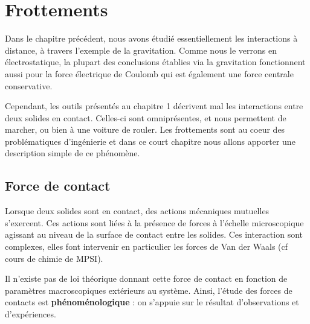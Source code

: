 \documentclass[11pt,fleqn]{book} %
\begin{document}









\setcounter{chapter}{1}

\chapter{Frottements}

Dans le chapitre précédent, nous avons étudié essentiellement les interactions à distance, à travers l'exemple de la gravitation. Comme nous le verrons en électrostatique, la plupart des conclusions établies via la gravitation fonctionnent aussi pour la force électrique de Coulomb qui est également une force centrale conservative.

Cependant, les outils présentés au chapitre 1 décrivent mal les interactions entre deux solides en contact. Celles-ci sont omniprésentes, et nous permettent de marcher, ou bien à une voiture de rouler. Les frottements sont au coeur des problématiques d'ingénierie et dans ce court chapitre nous allons apporter une description simple de ce phénomène.

\section{Force de contact}

Lorsque deux solides sont en contact, des actions mécaniques mutuelles s'exercent. Ces actions sont liées à la présence de forces à l'échelle microscopique agissant au niveau de la surface de contact entre les solides. Ces interaction sont complexes, elles font intervenir en particulier les forces de Van der Waals (cf cours de chimie de MPSI).

Il n'existe pas de loi théorique donnant cette force de contact en fonction de paramètres macroscopiques extérieurs au système. Ainsi, l'étude des forces de contacts est \textbf{phénoménologique} : on s'appuie sur le résultat d'observations et d'expériences.
\end{document}
